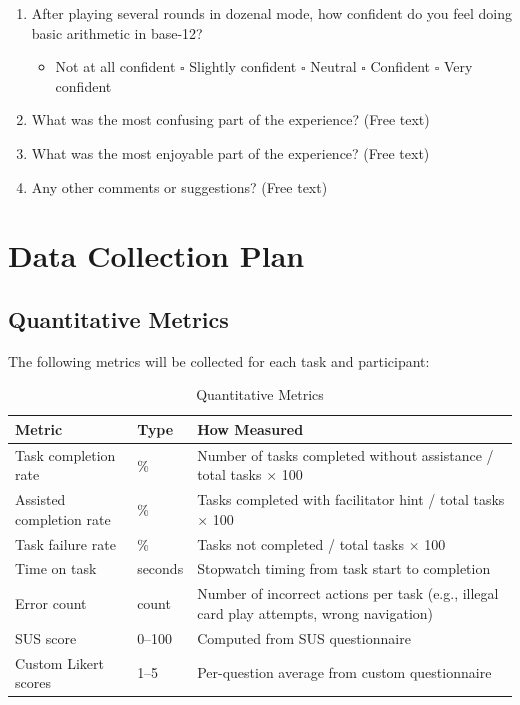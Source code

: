 \documentclass[12pt, titlepage]{article}
\begin{document}
\begin{enumerate}
\begin{itemize}[label=$\square$]
  \end{itemize}
  \item After playing several rounds in dozenal mode, how confident do you feel doing basic arithmetic in base-12?
  \begin{itemize}[label=$\square$]
    \item Not at all confident \quad $\square$ Slightly confident \quad $\square$ Neutral \quad $\square$ Confident \quad $\square$ Very confident
  \end{itemize}
  \item What was the most confusing part of the experience? (Free text)
  \item What was the most enjoyable part of the experience? (Free text)
  \item Any other comments or suggestions? (Free text)
\end{enumerate}


\section{Data Collection Plan}\label{sec:data-collection}

\subsection{Quantitative Metrics}

The following metrics will be collected for each task and participant:

\begin{table}[H]
\centering
\caption{Quantitative Metrics}
\begin{tabularx}{\textwidth}{l l X}
\toprule
\textbf{Metric} & \textbf{Type} & \textbf{How Measured} \\
\midrule
Task completion rate & \% & Number of tasks completed without assistance / total tasks $\times$ 100 \\
Assisted completion rate & \% & Tasks completed with facilitator hint / total tasks $\times$ 100 \\
Task failure rate & \% & Tasks not completed / total tasks $\times$ 100 \\
Time on task & seconds & Stopwatch timing from task start to completion \\
Error count & count & Number of incorrect actions per task (e.g., illegal card play attempts, wrong navigation) \\
SUS score & 0--100 & Computed from SUS questionnaire \\
Custom Likert scores & 1--5 & Per-question average from custom questionnaire \\
\bottomrule
\end{tabularx}
\end{table}
\end{document}
